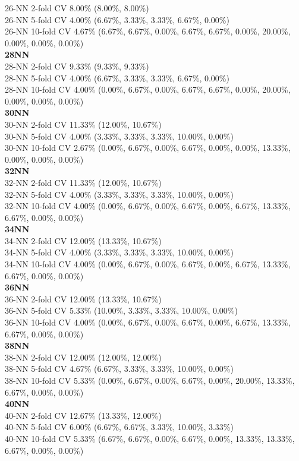 \documentclass[11pt,a4paper]{article}
\begin{document}
26-NN 2-fold CV   8.00\%   (8.00\%, 8.00\%)\\  
26-NN 5-fold CV   4.00\%   (6.67\%, 3.33\%, 3.33\%, 6.67\%, 0.00\%)\\  
26-NN 10-fold CV   4.67\%   (6.67\%, 6.67\%, 0.00\%, 6.67\%, 6.67\%, 0.00\%, 20.00\%, 0.00\%, 0.00\%, 0.00\%) \\ 
\textbf{28NN }\\
28-NN 2-fold CV   9.33\%   (9.33\%, 9.33\%)\\  
28-NN 5-fold CV   4.00\%   (6.67\%, 3.33\%, 3.33\%, 6.67\%, 0.00\%)\\  
28-NN 10-fold CV   4.00\%   (0.00\%, 6.67\%, 0.00\%, 6.67\%, 6.67\%, 0.00\%, 20.00\%, 0.00\%, 0.00\%, 0.00\%)\\  
\textbf{30NN }\\
30-NN 2-fold CV   11.33\%   (12.00\%, 10.67\%)\\  
30-NN 5-fold CV   4.00\%   (3.33\%, 3.33\%, 3.33\%, 10.00\%, 0.00\%)\\  
30-NN 10-fold CV   2.67\%   (0.00\%, 6.67\%, 0.00\%, 6.67\%, 0.00\%, 0.00\%, 13.33\%, 0.00\%, 0.00\%, 0.00\%)\\  
\textbf{32NN }\\
32-NN 2-fold CV   11.33\%   (12.00\%, 10.67\%)\\  
32-NN 5-fold CV   4.00\%   (3.33\%, 3.33\%, 3.33\%, 10.00\%, 0.00\%)\\  
32-NN 10-fold CV   4.00\%   (0.00\%, 6.67\%, 0.00\%, 6.67\%, 0.00\%, 6.67\%, 13.33\%, 6.67\%, 0.00\%, 0.00\%)\\  
\textbf{34NN }\\
34-NN 2-fold CV   12.00\%   (13.33\%, 10.67\%)\\  
34-NN 5-fold CV   4.00\%   (3.33\%, 3.33\%, 3.33\%, 10.00\%, 0.00\%)\\  
34-NN 10-fold CV   4.00\%   (0.00\%, 6.67\%, 0.00\%, 6.67\%, 0.00\%, 6.67\%, 13.33\%, 6.67\%, 0.00\%, 0.00\%)\\  
\textbf{36NN }\\
36-NN 2-fold CV   12.00\%   (13.33\%, 10.67\%)\\  
36-NN 5-fold CV   5.33\%   (10.00\%, 3.33\%, 3.33\%, 10.00\%, 0.00\%)\\  
36-NN 10-fold CV   4.00\%   (0.00\%, 6.67\%, 0.00\%, 6.67\%, 0.00\%, 6.67\%, 13.33\%, 6.67\%, 0.00\%, 0.00\%)\\  
\textbf{38NN }\\
38-NN 2-fold CV   12.00\%   (12.00\%, 12.00\%)\\  
38-NN 5-fold CV   4.67\%   (6.67\%, 3.33\%, 3.33\%, 10.00\%, 0.00\%)\\  
38-NN 10-fold CV   5.33\%   (0.00\%, 6.67\%, 0.00\%, 6.67\%, 0.00\%, 20.00\%, 13.33\%, 6.67\%, 0.00\%, 0.00\%)\\ \textbf{40NN }\\
40-NN 2-fold CV   12.67\%   (13.33\%, 12.00\%)\\ 
40-NN 5-fold CV   6.00\%   (6.67\%, 6.67\%, 3.33\%, 10.00\%, 3.33\%)\\ 
40-NN 10-fold CV   5.33\%   (6.67\%, 6.67\%, 0.00\%, 6.67\%, 0.00\%, 13.33\%, 13.33\%, 6.67\%, 0.00\%, 0.00\%)\\ 
\end{document}
